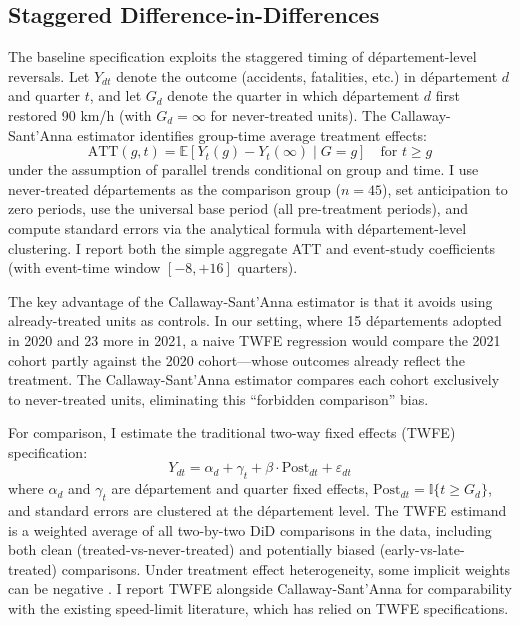 \documentclass[12pt]{article}
\newcommand{\E}{\mathbb{E}}
\newcommand{\ind}{\mathbb{I}}
\begin{document}
\subsection{Staggered Difference-in-Differences}

The baseline specification exploits the staggered timing of d\'{e}partement-level reversals. Let $Y_{dt}$ denote the outcome (accidents, fatalities, etc.) in d\'{e}partement $d$ and quarter $t$, and let $G_d$ denote the quarter in which d\'{e}partement $d$ first restored 90 km/h (with $G_d = \infty$ for never-treated units). The Callaway-Sant'Anna estimator \citep{callaway2021} identifies group-time average treatment effects:
\begin{equation}
\text{ATT}(g, t) = \E[Y_t(g) - Y_t(\infty) \mid G = g] \quad \text{for } t \geq g
\end{equation}
under the assumption of parallel trends conditional on group and time. I use never-treated d\'{e}partements as the comparison group ($n = 45$), set anticipation to zero periods, use the universal base period (all pre-treatment periods), and compute standard errors via the analytical formula with d\'{e}partement-level clustering. I report both the simple aggregate ATT and event-study coefficients (with event-time window $[-8, +16]$ quarters).

The key advantage of the Callaway-Sant'Anna estimator is that it avoids using already-treated units as controls. In our setting, where 15 d\'{e}partements adopted in 2020 and 23 more in 2021, a naive TWFE regression would compare the 2021 cohort partly against the 2020 cohort---whose outcomes already reflect the treatment. The Callaway-Sant'Anna estimator compares each cohort exclusively to never-treated units, eliminating this ``forbidden comparison'' bias.

For comparison, I estimate the traditional two-way fixed effects (TWFE) specification:
\begin{equation}
Y_{dt} = \alpha_d + \gamma_t + \beta \cdot \text{Post}_{dt} + \varepsilon_{dt}
\label{eq:twfe}
\end{equation}
where $\alpha_d$ and $\gamma_t$ are d\'{e}partement and quarter fixed effects, $\text{Post}_{dt} = \ind\{t \geq G_d\}$, and standard errors are clustered at the d\'{e}partement level. The TWFE estimand is a weighted average of all two-by-two DiD comparisons in the data, including both clean (treated-vs-never-treated) and potentially biased (early-vs-late-treated) comparisons. Under treatment effect heterogeneity, some implicit weights can be negative \citep{dechaisemartin2020, goodman2021}. I report TWFE alongside Callaway-Sant'Anna for comparability with the existing speed-limit literature, which has relied on TWFE specifications.
\end{document}
